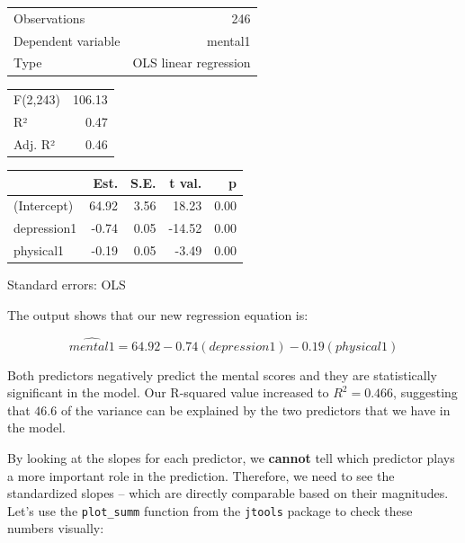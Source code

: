 \documentclass[]{book}
\begin{document}
\begin{table}[!h]
\centering
\begin{tabular}{lr}
\toprule
\rowcolor{gray!6}  Observations & 246\\
Dependent variable & mental1\\
\rowcolor{gray!6}  Type & OLS linear regression\\
\bottomrule
\end{tabular}
\end{table} \begin{table}[!h]
\centering
\begin{tabular}{lr}
\toprule
\rowcolor{gray!6}  F(2,243) & 106.13\\
R² & 0.47\\
\rowcolor{gray!6}  Adj. R² & 0.46\\
\bottomrule
\end{tabular}
\end{table} \begin{table}[!h]
\centering
\begin{threeparttable}
\begin{tabular}{lrrrr}
\toprule
  & Est. & S.E. & t val. & p\\
\midrule
\rowcolor{gray!6}  (Intercept) & 64.92 & 3.56 & 18.23 & 0.00\\
depression1 & -0.74 & 0.05 & -14.52 & 0.00\\
\rowcolor{gray!6}  physical1 & -0.19 & 0.05 & -3.49 & 0.00\\
\bottomrule
\end{tabular}
\begin{tablenotes}
\item Standard errors: OLS
\end{tablenotes}
\end{threeparttable}
\end{table}

The output shows that our new regression equation is:

\[\hat{mental1} = 64.92 -0.74(depression1) -0.19(physical1)\]

Both predictors negatively predict the mental scores and they are statistically significant in the model. Our R-squared value increased to \(R^2=0.466\), suggesting that \(46.6%
\) of the variance can be explained by the two predictors that we have in the model.

By looking at the slopes for each predictor, we \textbf{cannot} tell which predictor plays a more important role in the prediction. Therefore, we need to see the standardized slopes -- which are directly comparable based on their magnitudes. Let's use the \texttt{plot\_summ} function from the \texttt{jtools} package to check these numbers visually:
\end{document}
